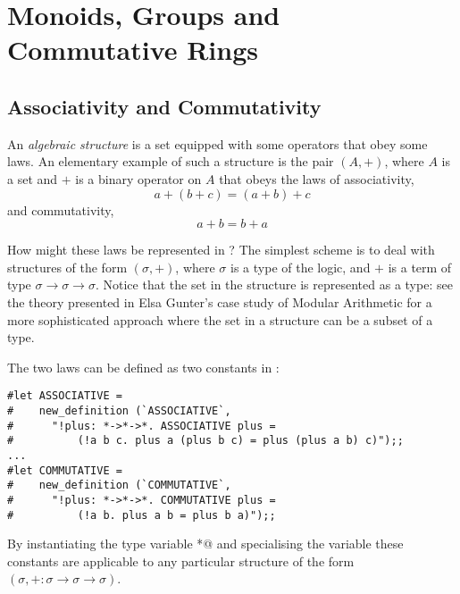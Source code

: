 
\section{Monoids, Groups and Commutative Rings}
\label{MonoidsGroupsRings}

\subsection{Associativity and Commutativity}

An {\em algebraic structure} is a set equipped with some operators that 
obey some laws.  An elementary example of such a structure is the pair 
$(A,+)$, where $A$ is a set and $+$ is a binary operator on $A$ that obeys 
the laws of associativity,
\[
a + (b + c) = (a + b) + c
\]
and commutativity,
\[
a + b = b + a
\]

How might these laws be represented in \HOL{}?  The simplest scheme is 
to deal with structures of the form $(\sigma, +)$, where $\sigma$ is a 
type of the \HOL{} logic, and $+$ is a \HOL{} term of type 
$\sigma\to\sigma\to\sigma$.  Notice that the set in the structure is 
represented as a \HOL{} type: see the theory \verb@group@ presented in 
Elsa Gunter's case study of Modular Arithmetic for a more sophisticated 
approach where the set in a structure can be a subset of a \HOL{} type.

The two laws can be defined as two constants in \HOL{}:
\begin{session}
\begin{verbatim}
#let ASSOCIATIVE =
#    new_definition (`ASSOCIATIVE`,
#      "!plus: *->*->*. ASSOCIATIVE plus =
#          (!a b c. plus a (plus b c) = plus (plus a b) c)");;
...
#let COMMUTATIVE =
#    new_definition (`COMMUTATIVE`,
#      "!plus: *->*->*. COMMUTATIVE plus =
#          (!a b. plus a b = plus b a)");;
\end{verbatim}
\end{session}
By instantiating the type variable \verb@*@ and specialising the variable 
\verb@plus@ these constants are applicable to any particular structure 
of the form $(\sigma, +: \sigma\to\sigma\to\sigma)$.

